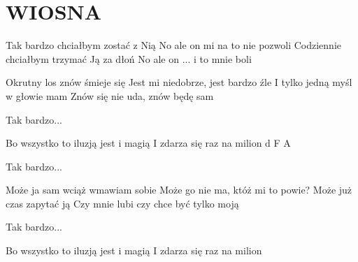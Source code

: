 \documentclass[../../../songbook.tex]{subfiles}
\begin{document}
\TabPositions{8cm} %
\section*{WIOSNA}
{}
\vspace{0.5cm}

\-\hspace{1cm} Tak bardzo chciałbym zostać z Nią		 \newline
\-\hspace{1cm} No ale on mi na to nie pozwoli			 \newline
\-\hspace{1cm} Codziennie chciałbym trzymać Ją za dłoń	 \newline
\-\hspace{1cm} No ale on ... i to mnie boli				 \newline

Okrutny los znów śmieje się		 \newline
Jest mi niedobrze, jest bardzo źle	 \newline
I tylko jedną myśl w głowie mam		 \newline
Znów się nie uda, znów będę sam	 \newline

\-\hspace{1cm} Tak bardzo...		\newline	

Bo wszystko to iluzją jest i magią		 \newline
I zdarza się raz na milion 			d F A \newline

\-\hspace{1cm} Tak bardzo...		\newline	

Może ja sam wciąż wmawiam sobie			\newline
Może go nie ma, któż mi to powie?		\newline
Może już czas zapytać ją				\newline
Czy mnie lubi czy chce być tylko moją	\newline

\-\hspace{1cm} Tak bardzo...			\newline	

Bo wszystko to iluzją jest i magią		\newline
I zdarza się raz na milion				\newline
\end{document}
